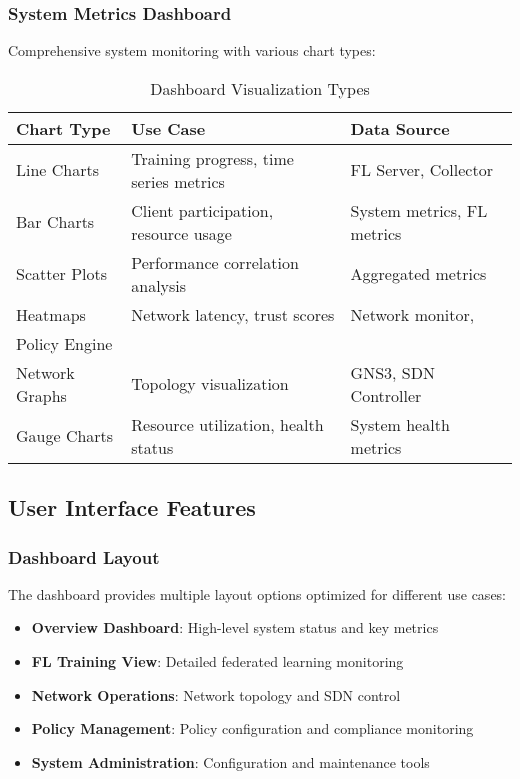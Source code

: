 \subsubsection{System Metrics Dashboard}

Comprehensive system monitoring with various chart types:

\begin{table}[H]
\centering
\caption{Dashboard Visualization Types}
\label{tab:dashboard-visualizations}
\begin{tabular}{@{}llp{5cm}@{}}
\toprule
\textbf{Chart Type} & \textbf{Use Case} & \textbf{Data Source} \\
\midrule
Line Charts & Training progress, time series metrics & FL Server, Collector \\
Bar Charts & Client participation, resource usage & System metrics, FL metrics \\
Scatter Plots & Performance correlation analysis & Aggregated metrics \\
Heatmaps & Network latency, trust scores & Network monitor,\\Policy Engine \\
Network Graphs & Topology visualization & GNS3, SDN Controller \\
Gauge Charts & Resource utilization, health status & System health metrics \\
\bottomrule
\end{tabular}
\end{table}

\subsection{User Interface Features}

\subsubsection{Dashboard Layout}

The dashboard provides multiple layout options optimized for different use cases:

\begin{itemize}
    \item \textbf{Overview Dashboard}: High-level system status and key metrics
    \item \textbf{FL Training View}: Detailed federated learning monitoring
    \item \textbf{Network Operations}: Network topology and SDN control
    \item \textbf{Policy Management}: Policy configuration and compliance monitoring
    \item \textbf{System Administration}: Configuration and maintenance tools
\end{itemize}


